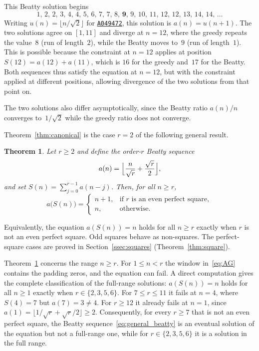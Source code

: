 \documentclass{birkjour}
\newtheorem{theorem}{Theorem}
\theoremstyle{definition}
\theoremstyle{remark}
\newcommand{\fl}[1]{\lfloor #1 \rfloor}
\begin{document}
This Beatty solution begins
\[
  1,\, 2,\, 2,\, 3,\, 4,\, 4,\, 5,\, 6,\, 7,\, 7,\,
  8,\, \mathbf{9},\, 9,\, 10,\, 11,\, 12,\, 12,\,
  13,\, 14,\, 14,\, \ldots
\]
Writing $u(n)=\fl{n/\!\sqrt{2}}$ for
\href{https://oeis.org/A049472}{\texttt{A049472}}, this
solution is $a(n)=u(n{+}1)$.
The two solutions agree on $[1,11]$ and diverge at
$n=12$, where the greedy repeats the value~$8$ (run of
length~$2$), while the Beatty moves to~$9$ (run of
length~$1$). This is possible because the constraint
at $n=12$ applies at position
$S(12)=a(12)+a(11)$, which is $16$ for the greedy
and~$17$ for the Beatty. Both sequences thus satisfy
the equation at $n=12$, but with the constraint
applied at different positions, allowing divergence
of the two solutions from that point on.

The two solutions also differ asymptotically, since the
Beatty ratio $a(n)/n$ converges to~$1/\!\sqrt{2}$ while the
greedy ratio does not converge.

Theorem~\ref{thm:canonical} is the case $r=2$
of the following general result.

\begin{theorem}\label{thm:universal}
Let $r\ge 2$ and define the order-$r$ Beatty
sequence
\begin{equation}\label{eq:general_beatty}
  a(n)=\Bigl\lfloor
  \frac{n}{\sqrt{r}}+\frac{\sqrt{r}}{2}
  \Bigr\rfloor,
\end{equation}
and set $S(n)=\sum_{j=0}^{r-1}a(n{-}j)$. Then, for all
$n\ge r$,
\[
  a\bigl(S(n)\bigr)=
  \begin{cases}
    n+1, & \text{if $r$ is an even perfect square},\\
    n,   & \text{otherwise}.
  \end{cases}
\]
\end{theorem}

Equivalently, the equation $a(S(n))=n$ holds for all $n\ge r$
exactly when $r$ is not an even perfect square. Odd squares
behave as non-squares. The perfect-square cases are proved in
Section~\ref{ssec:squares} (Theorem~\ref{thm:square}).

Theorem~\ref{thm:universal} concerns the range $n\ge r$.
For $1\le n<r$ the window in~\eqref{eq:AG} contains the
padding zeros, and the equation can fail. A direct computation
gives the complete classification of the full-range solutions:
$a(S(n))=n$ holds for all $n\ge 1$ exactly when
$r\in\{2,3,5,6\}$. For $7\le r\le 11$ it fails at $n=4$, where
$S(4)=7$ but $a(7)=3\ne 4$. For $r\ge 12$ it already fails at
$n=1$, since $a(1)=\fl{1/\!\sqrt{r}+\sqrt{r}/2}\ge 2$.
Consequently, for every $r\ge 7$ that is not an even perfect
square, the Beatty sequence~\eqref{eq:general_beatty} is an
eventual solution of the equation but not a full-range one,
while for $r\in\{2,3,5,6\}$ it is a solution in the full range.
\end{document}
